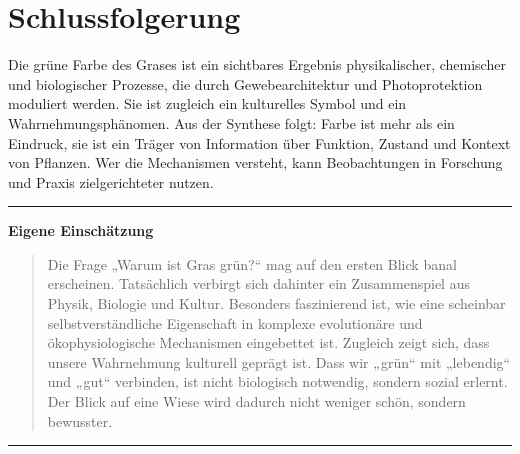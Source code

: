 \section{Schlussfolgerung}
Die grüne Farbe des Grases ist ein sichtbares Ergebnis physikalischer, chemischer und biologischer Prozesse, die durch Gewebearchitektur und Photoprotektion moduliert werden. Sie ist zugleich ein kulturelles Symbol und ein Wahrnehmungsphänomen. Aus der Synthese folgt: Farbe ist mehr als ein Eindruck, sie ist ein Träger von Information über Funktion, Zustand und Kontext von Pflanzen. Wer die Mechanismen versteht, kann Beobachtungen in Forschung und Praxis zielgerichteter nutzen.

\vspace{1cm}
\hrule
\vspace{0.5cm}

\noindent\textbf{Eigene Einschätzung}
\begin{quote}
Die Frage „Warum ist Gras grün?“ mag auf den ersten Blick banal erscheinen. Tatsächlich verbirgt sich dahinter ein Zusammenspiel aus Physik, Biologie und Kultur. Besonders faszinierend ist, wie eine scheinbar selbstverständliche Eigenschaft in komplexe evolutionäre und ökophysiologische Mechanismen eingebettet ist. Zugleich zeigt sich, dass unsere Wahrnehmung kulturell geprägt ist. Dass wir „grün“ mit „lebendig“ und „gut“ verbinden, ist nicht biologisch notwendig, sondern sozial erlernt. Der Blick auf eine Wiese wird dadurch nicht weniger schön, sondern bewusster.
\end{quote}

\vspace{0.5cm}
\hrule
